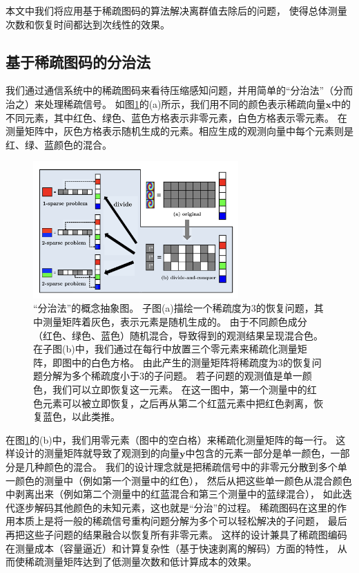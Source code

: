 \documentclass[AutoFakeBold]{LZUThesis}
\begin{document}
本文中我们将应用基于稀疏图码的算法解决离群值去除后的问题，
使得总体测量次数和恢复时间都达到次线性的效果。

\subsection{基于稀疏图码的分治法}
\label{d_n_c}

我们通过通信系统中的稀疏图码来看待压缩感知问题，并用简单的“分治法”（分而治之）来处理稀疏信号。
如图\ref{fig_divide_conquer}的(a)所示，我们用不同的颜色表示稀疏向量$\mathbf{x}$中的不同元素，其中红色、绿色、蓝色方格表示非零元素，白色方格表示零元素。
在测量矩阵中，灰色方格表示随机生成的元素。相应生成的观测向量中每个元素则是红、绿、蓝颜色的混合。
\begin{figure}[H]
    \centering
    \includegraphics[width=0.7\textwidth]{figures/d_n_c.png}
    \caption{“分治法”的概念抽象图。
    子图(a)描绘一个稀疏度为3的恢复问题，其中测量矩阵着灰色，表示元素是随机生成的。
    由于不同颜色成分（红色、绿色、蓝色）随机混合，导致得到的观测结果呈现混合色。
    在子图(b)中，我们通过在每行中放置三个零元素来稀疏化测量矩阵，即图中的白色方格。
    由此产生的测量矩阵将稀疏度为3的恢复问题分解为多个稀疏度小于3的子问题。
    若子问题的观测值是单一颜色，我们可以立即恢复这一元素。
    在这一图中，第一个测量中的红色元素可以被立即恢复，之后再从第二个红蓝元素中把红色剥离，恢复蓝色，以此类推。}
    \label{fig_divide_conquer}
\end{figure}
在图\ref{fig_divide_conquer}的(b)中，我们用零元素（图中的空白格）来稀疏化测量矩阵的每一行。
这样设计的测量矩阵就导致了观测到的向量$\mathbf{y}$中包含的元素一部分是单一颜色，一部分是几种颜色的混合。
我们的设计理念就是把稀疏信号中的非零元分散到多个单一颜色的测量中（例如第一个测量中的红色），
然后从把这些单一颜色从混合颜色中剥离出来（例如第二个测量中的红蓝混合和第三个测量中的蓝绿混合），
如此迭代逐步解码其他颜色的未知元素，这也就是“分治”的过程。
稀疏图码在这里的作用本质上是将一般的稀疏信号重构问题分解为多个可以轻松解决的子问题，
最后再把这些子问题的结果融合以恢复所有非零元素。
这样的设计兼具了稀疏图编码在测量成本（容量逼近）和计算复杂性（基于快速剥离的解码）方面的特性，
从而使稀疏测量矩阵达到了低测量次数和低计算成本的效果。
\end{document}
